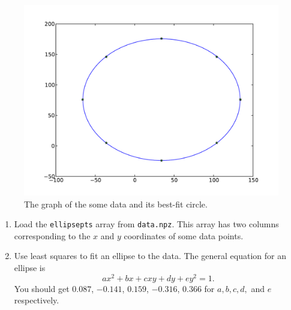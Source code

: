 \begin{figure}
\includegraphics[width=\textwidth]{circle.pdf}
\caption{The graph of the some data and its best-fit circle.}
\label{fig:circle}
\end{figure}

\begin{problem}
\leavevmode
\begin{enumerate}
\item Load the \texttt{ellipsepts} array from \texttt{data.npz}. This array has two columns corresponding to the $x$ and $y$ coordinates of some data points.
\item Use least squares to fit an ellipse to the data. 
The general equation for an ellipse is
\[
ax^2 + bx + cxy + dy + ey^2 = 1.
\]
You should get  $0.087$, $-0.141$,  $0.159$, $-0.316$, $0.366$ for $a, b, c, d,$ and $e$ respectively.
\end{enumerate}
\end{problem}

